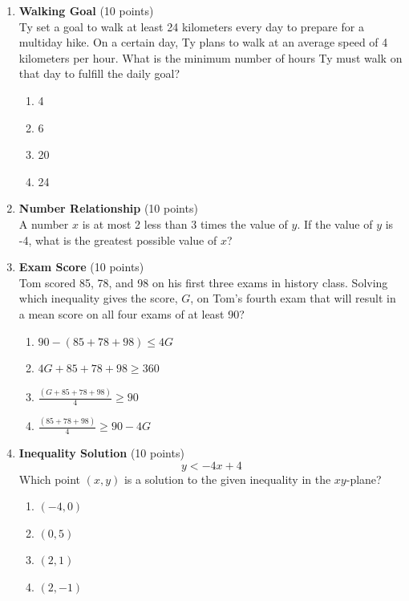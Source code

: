 \begin{enumerate}
  \item \textbf{Walking Goal} (10 points)\\
  Ty set a goal to walk at least 24 kilometers every day to prepare for a multiday hike. On a certain day, Ty plans to walk at an average speed of 4 kilometers per hour. What is the minimum number of hours Ty must walk on that day to fulfill the daily goal?\\
  \begin{enumerate}[label=(\Alph*)]
    \item 4
    \item 6
    \item 20
    \item 24
  \end{enumerate}
  \begin{subanswer}
  \end{subanswer}

  \item \textbf{Number Relationship} (10 points)\\
  A number $x$ is at most 2 less than 3 times the value of $y$. If the value of $y$ is -4, what is the greatest possible value of $x$?
  \begin{subanswer}
  \end{subanswer}

  \item \textbf{Exam Score} (10 points)\\
  Tom scored 85, 78, and 98 on his first three exams in history class. Solving which inequality gives the score, $G$, on Tom's fourth exam that will result in a mean score on all four exams of at least 90?\\
  \begin{enumerate}[label=(\Alph*)]
    \item $90-(85+78+98) \leq 4G$
    \item $4G+85+78+98 \geq 360$
    \item $\frac{(G+85+78+98)}{4} \geq 90$
    \item $\frac{(85+78+98)}{4} \geq 90-4G$
  \end{enumerate}
  \begin{subanswer}
  \end{subanswer}

  \item \textbf{Inequality Solution} (10 points)\\
  \[y<-4x+4\]
  Which point $(x,y)$ is a solution to the given inequality in the $xy$-plane?\\
  \begin{enumerate}[label=(\Alph*)]
    \item $(-4,0)$
    \item $(0,5)$
    \item $(2,1)$
    \item $(2,-1)$
  \end{enumerate}
  \begin{subanswer}
  \end{subanswer}


\end{enumerate}
